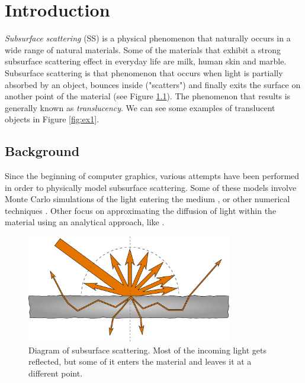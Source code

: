 \chapter{Introduction}
\label{chap:intro}
\emph{Subsurface scattering} (SS) is a physical phenomenon that naturally occurs in a wide range of natural materials. Some of the materials that exhibit a strong subsurface scattering effect in everyday life are milk, human skin and marble. Subsurface scattering is that phenomenon that occurs when light is partially absorbed by an object, bounces inside ("scatters") and finally exits the surface on another point of the material (see Figure \ref{fig:ssdiagram}). The phenomenon that results is generally known as \emph{translucency}. We can see some examples of translucent objects in Figure \ref{fig:ex1}.
\section{Background}
Since the beginning of computer graphics, various attempts have been performed in order to physically model subsurface scattering. Some of these models involve Monte Carlo simulations of the light entering the medium \citep{Pharr:2000:MCE:344779.344824}, or other numerical techniques \cite{Fattal:2009:PMI:1477926.1477933,Kaplanyan:2010:CLP:1730804.1730821}. Other focus on approximating the diffusion of light within the material using an analytical approach, like \citep{Jensen:2001:PMS:383259.383319}.
 
\clearpage
\begin{figure}[!ht]
\centering
\includegraphics[width=0.8\textwidth]{images/diagram.pdf}
\caption{Diagram of subsurface scattering. Most of the incoming light gets reflected, but some of it enters the material and leaves it at a different point.}
\label{fig:ssdiagram}
\end{figure}

